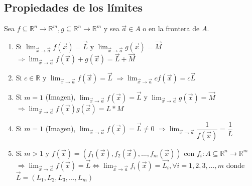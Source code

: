 \documentclass[12pt]{article}
\begin{document}
\subsection*{Propiedades de los límites}
Sea $f\subseteq\mathbb{R}^n\rightarrow\mathbb{R}^m, g\subseteq\mathbb{R}^n\rightarrow\mathbb{R}^m$ y sea $\vec{a}\in A$ o en la frontera de $A$.
\begin{enumerate}
    \item Si $\lim_{\vec{x}\rightarrow\vec{a}}{f(\vec{x})}=\vec{L}$ y $\lim_{\vec{x}\rightarrow\vec{a}}{g(\vec{x})}=\vec{M}$\newline
            $\Rightarrow\lim_{\vec{x}\rightarrow\vec{a}}{f(\vec{x})+g(\vec{x})}=\vec{L}+\vec{M}$
    \item Si $c\in\mathbb{R}$ y $\lim_{\vec{x}\rightarrow\vec{a}}{f(\vec{x})}=\vec{L}$
            $\Rightarrow\lim_{\vec{x}\rightarrow\vec{a}}{cf(\vec{x})}=c\vec{L}$
    \item Si $m=1$ (Imagen), $\lim_{\vec{x}\rightarrow\vec{a}}{f(\vec{x})}=\vec{L}$ y $\lim_{\vec{x}\rightarrow\vec{a}}{g(\vec{x})}=\vec{M}$
            $\Rightarrow\lim_{\vec{x}\rightarrow\vec{a}}{f(\vec{x})g(\vec{x})}=L*M$
    \item Si $m=1$ (Imagen), $\lim_{\vec{x}\rightarrow\vec{a}}{f(\vec{x})}=\vec{L} \not=0$
            $\Rightarrow\lim_{\vec{x}\rightarrow\vec{a}}{ \dfrac{1}{f(\vec{x})} }=\dfrac{1}{L}$
    \item Si $m>1$ y $f(\vec{x})=\left( f_1(\vec{x}),f_2(\vec{x}), \dots, f_m(\vec{x})\right)\text{ con } f_i:A\subseteq\mathbb{R}^n\rightarrow\mathbb{R}^m$
            $\Rightarrow \lim_{\vec{x}\rightarrow\vec{a}}{f(\vec{x})}=\vec{L}\Leftrightarrow\lim_{\vec{x}\rightarrow\vec{a}}{f_i(\vec{x})}=\vec{L_i}, \forall i=1,2,3,\dots,m$ donde $\vec{L}=(L_1,L_2,L_3,\dots, L_m)$
\end{enumerate}
\end{document}
